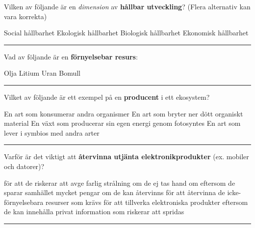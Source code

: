\documentclass{exam}
\begin{document}
\pagestyle{headandfoot}
\headrule
\footrule
\setlength{\columnsep}{0.25cm}

\vspace{5mm} %
\begin{center}
\end{center}
\vspace{5mm} %

\begin{questions}
    
\question Vilken av följande är en \textit{dimension} av \textbf{hållbar utveckling}? (Flera alternativ kan vara korrekta)
\begin{checkboxes}
   \choice Social hållbarhet
   \choice Ekologisk hållbarhet
   \choice Biologisk hållbarhet
   \choice Ekonomisk hållbarhet
\end{checkboxes} 

\vspace{5mm} 
\hrule 
\vspace{5mm} 
\question Vad av följande är en \textbf{förnyelsebar resurs}:
\begin{checkboxes}
   \choice Olja
   \choice Litium
   \choice Uran
   \choice Bomull
\end{checkboxes}

\vspace{5mm} 
\hrule 
\vspace{5mm} 
\question Vilket av följande är ett exempel på en \textbf{producent} i ett ekosystem?
\begin{checkboxes}
   \choice En art som konsumerar andra organismer
   \choice En art som bryter ner dött organiskt material
   \choice En växt som producerar sin egen energi genom fotosyntes
   \choice En art som lever i symbios med andra arter
\end{checkboxes}

\vspace{5mm} 
\hrule 
\vspace{5mm} 
\question Varför är det viktigt att \textbf{återvinna utjänta elektronikprodukter} (ex. mobiler och datorer)? 
\begin{checkboxes}
   \choice för att de riskerar att avge farlig strålning om de ej tas hand om
   \choice eftersom de sparar samhället mycket pengar om de kan återvinns
   \choice för att återvinna de icke-förnyelsebara resurser som krävs för att tillverka elektroniska produkter
   \choice eftersom de kan innehålla privat information som riskerar att spridas
\end{checkboxes}
\vspace{5mm} 
\hrule 
\vspace{5mm} 


\end{questions}
\end{document}
